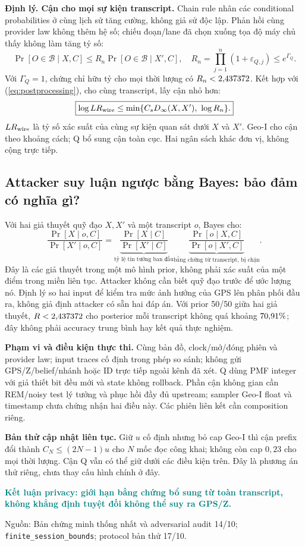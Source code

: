 \documentclass[10pt,a4paper]{article}
\newcommand{\key}[1]{\par\smallskip\noindent\textcolor{teal}{\textbf{#1}}\par\smallskip}
\newcommand{\source}[1]{\par{\footnotesize\color{gray}Nguồn: #1}\par}
\begin{document}
\textbf{Định lý. Cận cho mọi sự kiện transcript.} Chain rule nhân các conditional probabilities ở cùng
lịch sử tăng cường, không giả sử độc lập. Phản hồi cùng provider law không thêm hệ số;
chiếu đoạn/lane đã chọn xuống tọa độ máy chủ thấy không làm tăng tỷ số:
\begin{equation}
\boxed{\Pr[O\in\mathcal B\mid X,C]\le R_n\Pr[O\in\mathcal B\mid X',C],\quad
R_n=\prod_{j=1}^{n}(1+\varepsilon_{Q,j})\le e^{\Gamma_Q}.}
\label{eq:whole}
\end{equation}
Với $\Gamma_Q=1$, chứng chỉ hữu tỷ cho mọi thời lượng có $R_n<2{,}437372$.
Kết hợp với (\ref{eq:postprocessing}), cho cùng transcript, lấy cận nhỏ hơn:
\begin{equation}
\boxed{\log LR_{\rm wire}\le\min\{C_sD_\infty(X,X'),\ \log R_n\}.}
\label{eq:minimum}
\end{equation}
$LR_{\rm wire}$ là tỷ số xác suất của cùng sự kiện quan sát dưới $X$ và $X'$.
Geo-I cho cận theo khoảng cách; Q bổ sung cận toàn cục. Hai ngân sách khác đơn vị, không cộng trực tiếp.

\subsection{Attacker suy luận ngược bằng Bayes: bảo đảm có nghĩa gì?}
Với hai giả thuyết quỹ đạo $X,X'$ và một transcript $o$, Bayes cho:
\begin{equation}
\frac{\Pr[X\mid o,C]}{\Pr[X'\mid o,C]}
=\underbrace{\frac{\Pr[X\mid C]}{\Pr[X'\mid C]}}_{\text{tỷ lệ tin tưởng ban đầu}}
\underbrace{\frac{\Pr[o\mid X,C]}{\Pr[o\mid X',C]}}_{\text{bằng chứng từ transcript, bị chặn}}.
\label{eq:bayes}
\end{equation}
Đây là các giả thuyết trong một mô hình prior, không phải xác suất của một điểm trong miền liên tục.
Attacker không cần biết quỹ đạo trước để ước lượng nó. Định lý so hai input để kiểm tra mức ảnh hưởng của GPS
lên phân phối đầu ra, không giả định attacker có sẵn hai đáp án.
Với prior 50/50 giữa hai giả thuyết, $R<2{,}437372$ cho posterior mỗi transcript không quá khoảng
$70{,}91\%$; đây không phải accuracy trung bình hay kết quả thực nghiệm.

\textbf{Phạm vi và điều kiện thực thi.}
Cùng bản đồ, clock/mở/đóng phiên và provider law; input traces cố định trong phép so sánh;
không gửi GPS/Z/belief/nhánh hoặc ID trực tiếp ngoài kênh đã xét.
Q dùng PMF integer với giả thiết bit đều mới và state không rollback.
Phần cận không gian cần REM/noisy test lý tưởng và phục hồi đầy đủ upstream;
sampler Geo-I float và timestamp chưa chứng nhận hai điều này. Các phiên liên kết cần composition riêng.

\textbf{Bản thử cập nhật liên tục.} Giữ $u$ cố định nhưng bỏ cap Geo-I thì cận prefix đổi thành
$C_N\le(2N-1)u$ cho $N$ mốc đọc công khai; không còn cap $0{,}23$ cho mọi thời lượng.
Cận Q vẫn có thể giữ dưới các điều kiện trên. Đây là phương án thử riêng, chưa thay cấu hình chính ở đây.
\key{Kết luận privacy: giới hạn bằng chứng bổ sung từ toàn transcript, không khẳng định tuyệt đối không thể suy ra GPS/Z.}
\source{Bản chứng minh thống nhất và adversarial audit 14/10; \texttt{finite\_session\_bounds}; protocol bản thử 17/10.}
\end{document}
